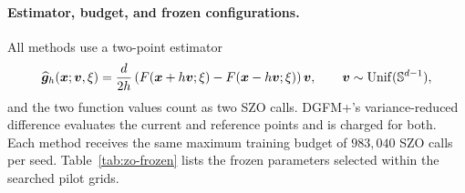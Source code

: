 \paragraph{Estimator, budget, and frozen configurations.}
All methods use a two-point estimator
\begin{equation}\label{eq:zo-two-point-estimator}
 \widehat{{\bm{g}}}_h({\bm{x}};{\bm{v}},\xi)
 =\frac{d}{2h}\left(F({\bm{x}}+h{\bm{v}};\xi)-F({\bm{x}}-h{\bm{v}};\xi)\right){\bm{v}},
 \qquad {\bm{v}}\sim\operatorname{Unif}(\mathbb S^{d-1}),
\end{equation}
and the two function values count as two SZO calls.  DGFM+'s
variance-reduced difference evaluates the current and reference points and is
charged for both.  Each method receives the same maximum training budget of
$983{,}040$ SZO calls per seed.  Table~\ref{tab:zo-frozen} lists the frozen
parameters selected within the searched pilot grids.

\begin{table}[t]
\centering
\caption{Frozen ZO configurations and maximum dependency depth under the
common work cap.}
\label{tab:zo-frozen}
\small
{}
\end{table}

\begin{table}[t]
\centering
\caption{Representative ZO first-hit means.  Each cell reports
communication depth / training SZO work in thousands.  Every displayed cell
has 20/20 confirmed hits.}
\label{tab:zo-representative}
\small
{}
\end{table}

